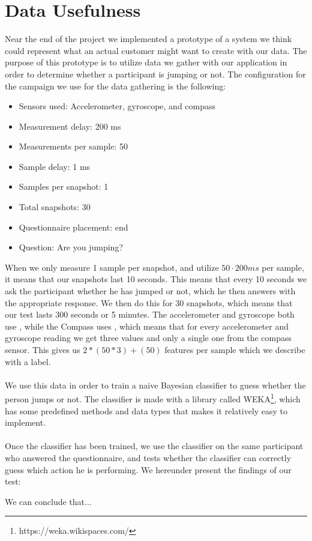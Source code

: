 
\section{Data Usefulness}
\label{sec:data_usefulness}

Near the end of the project we implemented a prototype of a system we think could represent what an actual customer might want to create with our data. The purpose of this prototype is to utilize data we gather with our application in order to determine whether a participant is jumping or not. The configuration for the campaign we use for the data gathering is the following:

\begin{itemize}
    \setlength\itemsep{-0.2em}
    \item Sensors used: Accelerometer, gyroscope, and compass
    \item Measurement delay: 200 ms
    \item Measurements per sample: 50
    \item Sample delay: 1 ms
    \item Samples per snapshot: 1
    \item Total snapshots: 30
    \item Questionnaire placement: end
    \item Question: Are you jumping?
\end{itemize}

When we only measure 1 sample per snapshot, and utilize $50 \cdot 200ms$ per sample, it means that our snapshots last 10 seconds. This means that every 10 seconds we ask the participant whether he has jumped or not, which he then answers with the appropriate response. We then do this for 30 snapshots, which means that our test lasts 300 seconds or 5 minutes. The accelerometer and gyroscope both use , while the Compass uses , which means that for every accelerometer and gyroscope reading we get three values and only a single one from the compass sensor. This gives us $2*(50 * 3) + (50)$ features per sample which we describe with a label.
\\\\
We use this data in order to train a naive Bayesian classifier to guess whether the person jumps or not. The classifier is made with a library called WEKA\footnote{https://weka.wikispaces.com/}, which has some predefined methods and data types that makes it relatively easy to implement.
\\\\
Once the classifier has been trained, we use the classifier on the same participant who answered the questionnaire, and tests whether the classifier can correctly guess which action he is performing. We hereunder present the findings of our test:


We can conclude that...

